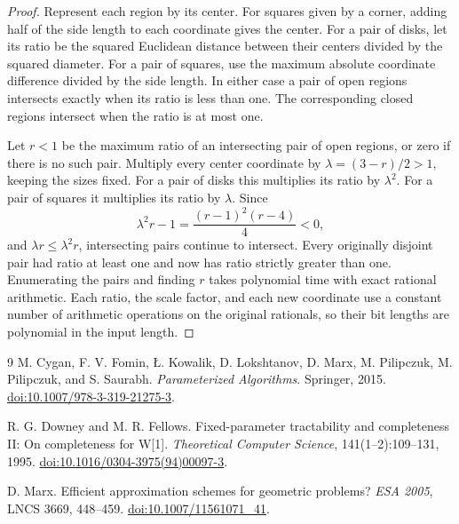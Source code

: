 \documentclass[11pt]{article}
\begin{document}
\begin{proof}
Represent each region by its center. For squares given by a corner,
adding half of the side length to each coordinate gives the center.
For a pair of disks, let its ratio be the squared Euclidean distance
between their centers divided by the squared diameter. For a pair of
squares, use the maximum absolute coordinate difference divided by
the side length. In either case a pair of open regions intersects
exactly when its ratio is less than one. The corresponding closed
regions intersect when the ratio is at most one.

Let \(r<1\) be the maximum ratio of an intersecting pair of open
regions, or zero if there is no such pair. Multiply every center
coordinate by \(\lambda=(3-r)/2>1\), keeping the sizes fixed.
For a pair of disks this multiplies its ratio by \(\lambda^2\).
For a pair of squares it multiplies its ratio by \(\lambda\).
Since
\[
  \lambda^2r-1=\frac{(r-1)^2(r-4)}{4}<0,
\]
and \(\lambda r\le\lambda^2r\), intersecting pairs continue to
intersect. Every originally disjoint pair had ratio at least one
and now has ratio strictly greater than one. Enumerating the pairs
and finding \(r\) takes polynomial time with exact rational
arithmetic. Each ratio, the scale factor, and each new coordinate use
a constant number of arithmetic operations on the original rationals,
so their bit lengths are polynomial in the input length.
\end{proof}

\begin{thebibliography}{9}
M. Cygan, F. V. Fomin, \L. Kowalik, D. Lokshtanov, D. Marx,
M. Pilipczuk, M. Pilipczuk, and S. Saurabh.
\emph{Parameterized Algorithms}. Springer, 2015.
\href{https://doi.org/10.1007/978-3-319-21275-3}{doi:10.1007/978-3-319-21275-3}.

R. G. Downey and M. R. Fellows.
Fixed-parameter tractability and completeness II: On completeness for W[1].
\emph{Theoretical Computer Science}, 141(1--2):109--131, 1995.
\href{https://doi.org/10.1016/0304-3975(94)00097-3}{doi:10.1016/0304-3975(94)00097-3}.

D. Marx.
Efficient approximation schemes for geometric problems?
\emph{ESA 2005}, LNCS 3669, 448--459.
\href{https://doi.org/10.1007/11561071_41}{doi:10.1007/11561071\_41}.
\end{thebibliography}
\end{document}
